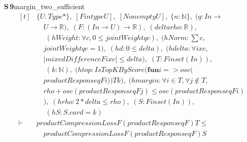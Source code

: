 \documentclass[conference]{IEEEtran}
\theoremstyle{definition}
\newcommand{\lean}[1]{\textsf{\footnotesize #1}}
\begin{document}
\noindent\textbf{S\,9}\quad\lean{margin\_two\_sufficient}
{\footnotesize\[ \begin{aligned}[t]
&\{ \mathit{U} : \mathit{Type}*\},\; [\mathit{Fintype} \mathit{U}],\; [\mathit{Nonempty} \mathit{U}],\; \{ \mathit{n} : \mathbb{N} \},\; (\mathit{q} : \mathit{I} \mathit{n} \to\\
&\quad \mathit{U} \to \mathbb{R} ),\; (\mathit{F} : (\mathit{I} \mathit{n} \to \mathit{U}) \to \mathbb{R} ),\; (\mathit{delta} \mathit{rho} : \mathbb{R} ),\\
&\quad \; (\mathit{hWeight} : \forall \mathit{c},0 \leq \mathit{jointWeight} \mathit{q} \mathit{c}),\; (\mathit{hNorm} : \textstyle\sum \mathit{c},\\
&\quad \mathit{jointWeight} \mathit{q} \mathit{c}=1),\; (\mathit{hd} : 0 \leq \mathit{delta}),\; (\mathit{hdelta} : \forall \mathit{i} \mathit{x} \mathit{c},\\
&\quad |\mathit{mixedDifference} \mathit{F} \mathit{i} \mathit{x} \mathit{c}| \leq \mathit{delta}),\; (\mathit{T} : \mathit{Finset} (\mathit{I} \mathit{n})),\\
&\quad \; (\mathit{k} : \mathbb{N} ),\; (\mathit{htop} : \mathit{IsTopKByScore} (\mathbf{fun} \mathit{i} => \mathit{osc} (\\
&\quad \mathit{productResponse} \mathit{q} \mathit{F} \mathit{i})) \mathit{T} \mathit{k}),\; (\mathit{hmargin} : \forall \mathit{i} \in \mathit{T},\forall \mathit{j} \notin \mathit{T},\\
&\quad \mathit{rho}+\mathit{osc} (\mathit{productResponse} \mathit{q} \mathit{F} \mathit{j}) \leq \mathit{osc} (\mathit{productResponse} \mathit{q} \mathit{F} \mathit{i})\\
&\quad ),\; (\mathit{hrho} : 2*\mathit{delta} \leq \mathit{rho}),\; (\mathit{S} : \mathit{Finset} (\mathit{I} \mathit{n})),\\
&\quad \; (\mathit{hS} : \mathit{S}.\mathit{card}=\mathit{k})\\
\vdash\;&\mathit{productCompressionLoss} \mathit{F} (\mathit{productResponse} \mathit{q} \mathit{F}) \mathit{T} \leq\\
&\quad \mathit{productCompressionLoss} \mathit{F} (\mathit{productResponse} \mathit{q} \mathit{F}) \mathit{S}
\end{aligned} \]}
\end{document}
